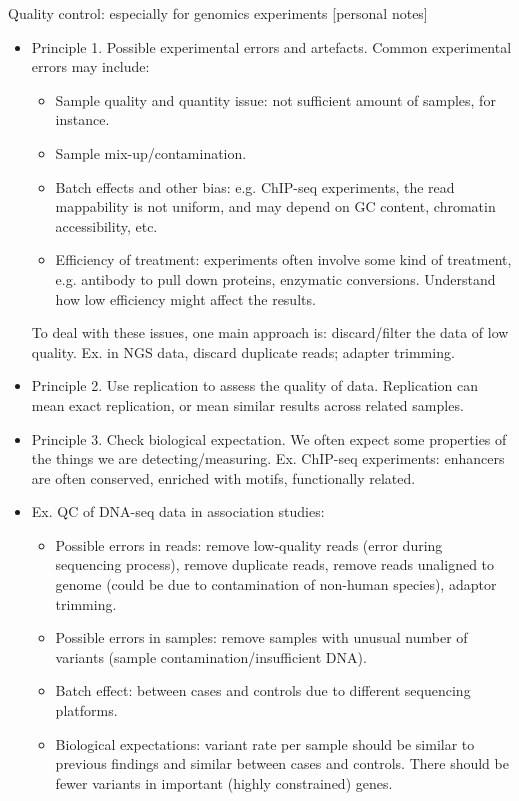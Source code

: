 \documentclass{report}
\begin{document}
Quality control: especially for genomics experiments [personal notes]
\begin{itemize}
	\item Principle 1. Possible experimental errors and artefacts. Common experimental errors may include: 
	\begin{itemize}
		\item Sample quality and quantity issue: not sufficient amount of samples, for instance. 
		\item Sample mix-up/contamination. 
		\item Batch effects and other bias: e.g. ChIP-seq experiments, the read mappability is not uniform, and may depend on GC content, chromatin accessibility, etc. 
		\item Efficiency of treatment: experiments often involve some kind of treatment, e.g. antibody to pull down proteins, enzymatic conversions. Understand how low efficiency might affect the results. 
	\end{itemize} 
	To deal with these issues, one main approach is: discard/filter the data of low quality. Ex. in NGS data, discard duplicate reads; adapter trimming. 
	
	\item Principle 2. Use replication to assess the quality of data. Replication can mean exact replication, or mean similar results across related samples.  
	
	\item Principle 3. Check biological expectation. We often expect some properties of the things we are detecting/measuring. Ex. ChIP-seq experiments: enhancers are often conserved, enriched with motifs, functionally related. 
	
	\item Ex. QC of DNA-seq data in association studies: 
	\begin{itemize}
		\item Possible errors in reads: remove low-quality reads (error during sequencing process), remove duplicate reads, remove reads unaligned to genome (could be due to contamination of non-human species), adaptor trimming. 
		\item Possible errors in samples: remove samples with unusual number of variants (sample contamination/insufficient DNA).
		\item Batch effect: between cases and controls due to different sequencing platforms.  
		\item Biological expectations: variant rate per sample should be similar to previous findings and similar between cases and controls. There should be fewer variants in important (highly constrained) genes.  
	\end{itemize} 
\end{itemize}
\end{document}
